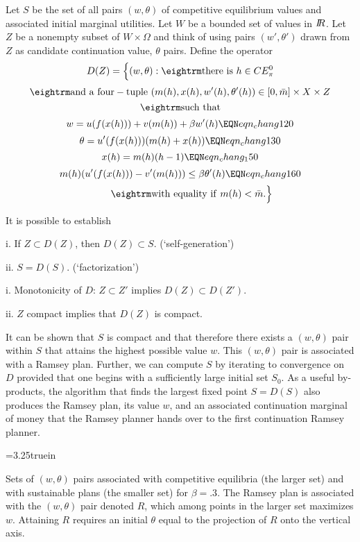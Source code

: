    Let $S$ be the set of all pairs $(w, \theta)$ of competitive equilibrium values and associated initial marginal utilities.
    Let $W$ be a bounded set of values in ${{I\kern-0.3em R}}$.
  Let $Z $ be a nonempty subset of $W \times \Omega$ and think
of using pairs $(w', \theta')$ drawn from $Z$ as candidate continuation value, $\theta$  pairs.
Define the operator
$$ D(Z) = \Bigl\{ (w,\theta): {\rm there \ is } \ h \in CE_\pi^0 $$
$$ {\rm and \ a  \ four-tuple } \ (m(h), x(h), w'(h), \theta'(h)) \in [0,\bar m]\times X \times Z  $$
$$ {\rm such \ that}$$
$$ w = u(f(x( h))) + v(m( h)) + \beta w'( h) \EQN eqn_chang120 $$
$$ \theta = u'(f(x( h))) ( m( h) + x( h))\EQN eqn_chang130 $$
$$ x(h) = m(h) (h-1) \EQN eqn_chang_150 $$
$$ m(h) (u'(f(x(h))) - v'(m(h))) \leq \beta \theta'(h)   \EQN eqn_chang160 $$
$$ \quad \quad \ {\rm with \ equality \ if } \ m(h) < \bar m .  \Bigr\}   $$


\noindent It is possible to establish
\medskip
{}
\item{i.} If $Z \subset D(Z)$, then $D(Z) \subset S$.  (`self-generation')
\item{ii.} $S = D(S)$. (`factorization')

\medskip
{}
\item{i.} Monotonicity of $D$: $Z \subset Z'$ implies $D(Z) \subset D(Z')$.
\item{ii.} $Z$ compact implies that $D(Z)$ is compact.

\medskip
It can be shown  that $S$ is compact and that therefore there exists  a $(w, \theta)$ pair within $S$ that attains the highest possible value
$w$.  This
 $(w, \theta)$ pair is associated with a Ramsey plan. Further, we can compute $S$ by iterating to convergence on $D$ provided that one begins with a sufficiently large initial
set $S_0$.
 As a  useful  by-products, the algorithm that finds the largest fixed point $S = D(S)$
also produces the Ramsey  plan, its value $w$,   and an associated continuation  marginal of money that the Ramsey planner hands over to
 the first continuation Ramsey planner.

\centerline{\epsfxsize=3.25truein}
\caption{Sets of $(w, \theta)$ pairs  associated with competitive equilibria (the larger set) and with sustainable plans (the smaller set) for $\beta = .3$.
   The Ramsey plan is associated with the $(w, \theta)$ pair
 denoted  $R$,  which among points in  the larger set maximizes $w$. Attaining $R$ requires an initial $\theta$ equal to the projection of $R$ onto the vertical axis.}
\endfigure


